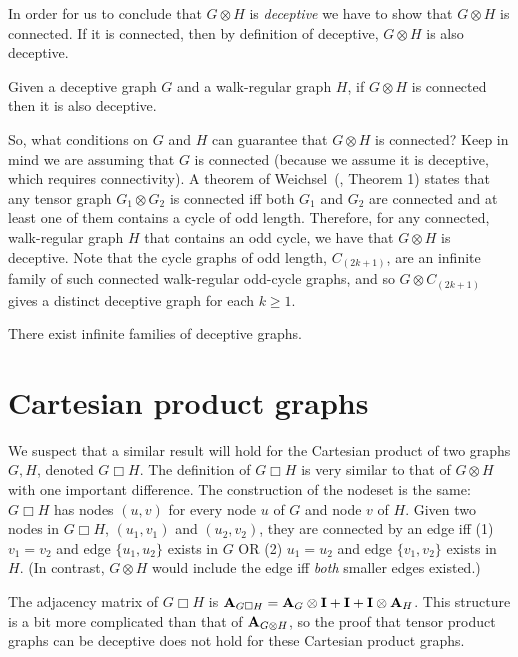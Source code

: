 In order for us to conclude that $G \otimes H$ is \emph{deceptive} we have to show that $G \otimes H$ is connected. If it is connected, then by definition of deceptive, $G \otimes H$ is also deceptive.

\begin{corollary}
  Given a deceptive graph $G$ and a walk-regular graph $H$, if $G \otimes H$ is connected then it is also deceptive.
\end{corollary}

So, what conditions on $G$ and $H$ can guarantee that $G \otimes H$ is connected? Keep in mind we are assuming that $G$ is connected (because we assume it is deceptive, which requires connectivity). A theorem of Weichsel~(\cite{weichsel1962kronecker}, Theorem 1) states that any tensor graph $G_1 \otimes G_2$ is connected iff both $G_1$ and $G_2$ are connected and at least one of them contains a cycle of odd length.
Therefore, for any connected, walk-regular graph $H$ that contains an odd cycle, we have that $G\otimes H$ is deceptive. Note that the cycle graphs of odd length, $C_{(2k+1)}$, are an infinite family of such connected walk-regular odd-cycle graphs, and so $G \otimes C_{(2k+1)}$ gives a distinct deceptive graph for each $k \geq 1$.

\begin{corollary}
  There exist infinite families of deceptive graphs.
\end{corollary}


\section{Cartesian product graphs}\label{sec:cartesian-graph}

We suspect that a similar result will hold for the Cartesian product of two graphs $G,H$, denoted $G \Box H$. The definition of $G \Box H$ is very similar to that of $G \otimes H$ with one important difference.
The construction of the nodeset is the same: $G \Box H$ has nodes $(u, v)$ for every node $u$ of $G$ and node $v$ of $H$. Given two nodes in $G \Box H$,  $(u_1, v_1)$ and $(u_2, v_2)$, they are connected by an edge iff (1) $v_1 = v_2$ and edge $\{u_1, u_2\}$ exists in $G$ OR (2) $u_1 = u_2$ and edge $\{v_1,v_2\}$ exists in $H$. (In contrast, $G \otimes H$ would include the edge iff \emph{both} smaller edges existed.)

The adjacency matrix of $G \Box H$ is $\textbf{A}_{G \Box H} = \textbf{A}_G \otimes \textbf{I} + \textbf{I} + \textbf{I} \otimes \textbf{A}_H$. This structure is a bit more complicated than that of $\textbf{A}_{G \otimes H}$, so the proof that tensor product graphs can be deceptive does not hold for these Cartesian product graphs.

